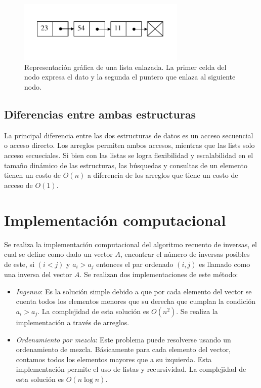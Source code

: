 \documentclass[letterpaper,11pt]{article}
\begin{document}
\begin{figure}[h!]
  \centering
  \includegraphics[width=8cm]{img/img_list.pdf}
  \caption{Representación gráfica de una lista enlazada. La primer celda del nodo expresa el dato y la segunda el puntero que enlaza al siguiente nodo.}
  \label{fig:ie}
\end{figure}



\subsection{Diferencias entre ambas estructuras}

La principal diferencia entre las dos estructuras de datos es un acceso secuencial o acceso directo. Los arreglos permiten ambos accesos, mientras que las lists solo acceso secueciales. Si bien con las listas se logra flexibilidad y escalabilidad en el tamaño dinámico de las estructuras, las búsquedas y consultas de un elemento tienen un costo de ${O}(n)$ a diferencia de los arreglos que tiene un costo de acceso de ${O}(1)$.


\section{Implementación computacional}

Se realiza la implementación computacional del algoritmo recuento de inversas, el cual se define como dado un vector $A$, encontrar el número de inversas posibles de este, si $(i <j)$ y $a_i > a_j$ entonces el par ordenado $(i,j)$ es llamado como una inversa del vector $A$. Se realizan dos implementaciones de este método:

\begin{itemize}
	\item \textit{Ingenuo}: Es la solución simple debido a que por cada elemento del vector se cuenta todos los elementos menores que su derecha que cumplan la condición $a_i > a_j$. La complejidad de esta solución es ${O}(n^2)$. Se realiza la implementación a través de arreglos.
	\item \textit{Ordenamiento por mezcla}: Este problema  puede resolverse usando un ordenamiento de mezcla. Básicamente para cada elemento del vector, contamos todos los elementos mayores que a su izquierda. Esta implementación permite el uso de listas y recursividad. La complejidad de esta solución es ${O}(n\log n)$.
\end{itemize}
\end{document}
